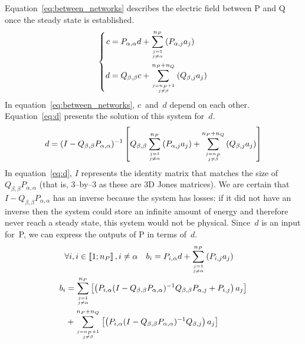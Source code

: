 \documentclass[a4paper,11pt]{article}
\begin{document}
Equation~\eqref{eq:between_networks} describes the electric field between P and Q once the steady state is established.
\begin{equation}
    \left\lbrace
    \begin{aligned}
        c
        &=
        P_{\alpha, \alpha} d + \sum_{j = 1 \atop j \neq \alpha}^{n_P}
        \left(
            P_{\alpha, j}a_j
        \right)
        \\
        d
        &=
        Q_{\beta, \beta} c + \sum_{j = n_P+1 \atop j \neq \beta}^{n_P + n_Q}
        \left(
            Q_{\beta, j}a_j
        \right)
    \end{aligned}
    \right.
    \label{eq:between_networks}
\end{equation}
In equation~\eqref{eq:between_networks}, $c$~and~$d$ depend on each other.
Equation~\eqref{eq:d} presents the solution of this system for~$d$.
\begin{equation}
    d =
    (I - Q_{\beta, \beta} P_{\alpha, \alpha})^{-1}
    \left[
        Q_{\beta, \beta}
        \sum_{j = 1 \atop j \neq \alpha}^{n_P}
        \left(
            P_{\alpha, j}
            a_j
        \right)
        +
        \sum_{j = n_P \atop j \neq \beta}^{n_P + n_Q}
        \left(
            Q_{\beta, j}
            a_j
        \right)
    \right]
    \label{eq:d}
\end{equation}
In equation~\eqref{eq:d}, $I$ represents the identity matrix that matches the size of $Q_{\beta, \beta}P_{\alpha, \alpha}$ (that is, 3--by--3 as these are 3D Jones matrices).
We are certain that $I - Q_{\beta, \beta} P_{\alpha, \alpha}$ has an inverse because the system has losses:
if it did not have an inverse then the system could store an infinite amount of energy and therefore never reach a steady state, this system would not be physical.
Since~$d$ is an input for~P, we can express the outputs of P in terms of~$d$.
\begin{gather}
\begin{aligned}
    \forall i, i
    &\in
    \left\llbracket 1 ; n_P \right\rrbracket, i \neq \alpha
    &
    b_i
    &=
    P_{i, \alpha} d
    + \sum_{j = 1 \atop j \neq \alpha}^{n_P}
    \left(
        P_{i, j}a_j
    \right)
\end{aligned}
\notag
\\
\begin{aligned}
    b_i
    &=
        \sum_{j = 1 \atop j \neq \alpha}^{n_P}
        \left[
            \left(
                P_{i, \alpha}
                (I - Q_{\beta, \beta} P_{\alpha, \alpha})^{-1}
                Q_{\beta, \beta}
                P_{\alpha, j}
                +
                P_{i, j}
            \right)
            a_j
        \right]
    \\
    &+
        \sum_{j = n_P+1 \atop j \neq \beta}^{n_P + n_Q}
        \left[
            \left(
                P_{i, \alpha}
                (I - Q_{\beta, \beta} P_{\alpha, \alpha})^{-1}
                Q_{\beta, j}
            \right)
            a_j
        \right]
\end{aligned}
\label{eq:P_side_of_S}
\end{gather}
\end{document}
